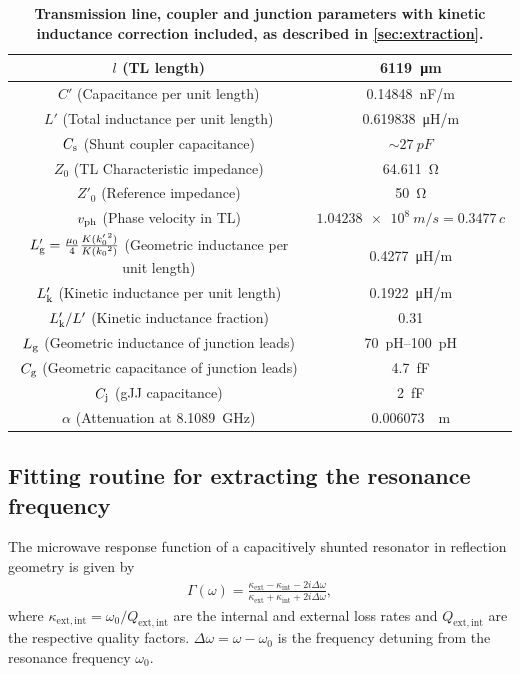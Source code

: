 \begin{table}
	\begin{center}
		\begin{tabular}{|c|c|}
			\hline 
			$l$ (TL length) & \SI{6119}{\micro\meter} \\ 
			\hline 
			$C'$ (Capacitance per unit length) & \SI{0.14848}{nF/m} \\ 
			\hline 
			$L'$ (Total inductance per unit length) & \SI{0.619838}{\micro\henry/m} \\ 
			\hline
			$C_{\rm s}$ (Shunt coupler capacitance) & $\sim\SI{27}{pF}$ \\ 
			\hline 
			$Z_0$ (TL Characteristic impedance) & \SI{64.611}{\ohm} \\
			\hline 
			$Z'_0$ (Reference impedance) & \SI{50}{\ohm} \\
			\hline 
			$v_{\rm ph}$ (Phase velocity in TL) & $\SI{1.04238e8}{m/s} = 0.3477\,c$ \\ 
			\hline
			$L'_{\rm g} = \frac{\mu_0}{4}\frac{K({k'_0}^2)}{K({k_0}^2)}$ (Geometric inductance per unit length) & \SI{0.4277}{\micro\henry/m} \\ 
			\hline
			$L'_{\rm k}$ (Kinetic inductance per unit length) & \SI{0.1922}{\micro\henry/m} \\ 
			\hline
			$L'_{\rm k}/L'$ (Kinetic inductance fraction) & \num{0.31} \\ 
			\hline
			$L_{\rm g}$ (Geometric inductance of junction leads) & \SIrange[range-phrase=--]{70}{100}{pH} \\ 
			\hline
			$C_{\rm g}$ (Geometric capacitance of junction leads) & \SI{4.7}{fF} \\ 
			\hline
			$C_{\rm j}$ (gJJ capacitance) & \SI{2}{fF} \\ 
			\hline
			$\alpha$ (Attenuation at \SI{8.1089}{GHz}) & \SI{0.006073}{\per\metre} \\ 
			\hline
		\end{tabular}
		\caption{\bf Transmission line, coupler and junction parameters with kinetic inductance correction included, as described in \ref{sec:extraction}.}
		\label{tab:tlpars}
	\end{center}
\end{table}

\clearpage

\subsection{Fitting routine for extracting the resonance frequency}\label{sec:fitting}
\noindent The microwave response function of a capacitively shunted resonator in reflection geometry is given by \cite{pozar_microwave_2012}
\begin{eqnarray}
\Gamma(\omega) = \frac{\kappa_\mathrm{ext}-\kappa_\mathrm{int}-2i\Delta\omega}{\kappa_\mathrm{ext}+\kappa_\mathrm{int}+2i\Delta\omega},
\end{eqnarray}
where $\kappa_\mathrm{ext,int}=\omega_0/Q_\mathrm{ext,int}$ are the internal and external loss rates and $Q_\mathrm{ext,int}$ are the respective quality factors.
$\Delta\omega=\omega-\omega_0$ is the frequency detuning from the resonance frequency $\omega_0$.

